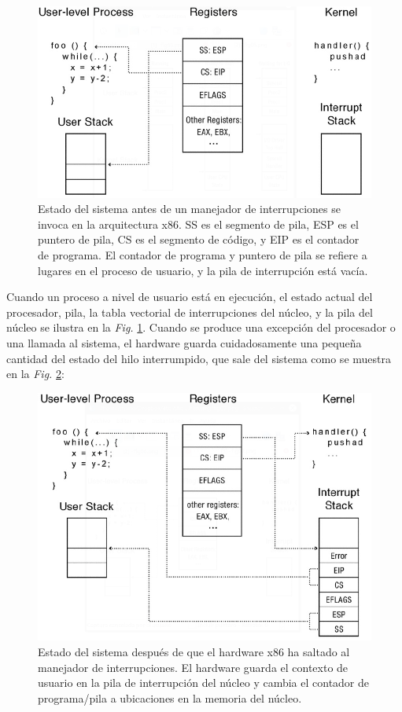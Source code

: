 \documentclass[10pt]{book}
\begin{document}
\begin{figure}[tbhp]
\centerline{\includegraphics[scale=0.55]{img/fig0206}}
\caption{Estado del sistema antes de un manejador de interrupciones se invoca en la arquitectura {\mf x86}. {\mf SS} es el segmento de pila, {\mf ESP} es el puntero de pila, {\mf CS} es el segmento de código, y {\mf EIP} es el contador de programa. El contador de programa y puntero de pila se refiere a lugares en el proceso de usuario, y la pila de interrupción está vacía.}
\label{fig0206}
\end{figure}

Cuando un proceso a nivel de usuario está en ejecución, el estado actual del procesador, pila, la tabla vectorial de interrupciones del núcleo, y la pila del núcleo se ilustra en la \textit{Fig.} \ref{fig0206}. Cuando se produce una excepción del procesador o una llamada al sistema, el hardware guarda cuidadosamente una pequeña cantidad del estado del hilo interrumpido, que sale del sistema como se muestra en la \textit{Fig.} \ref{fig0207}:

\begin{figure}[tbhp]
\centerline{\includegraphics[scale=0.55]{img/fig0207}}
\caption{Estado del sistema después de que el hardware {\mf x86} ha saltado al manejador de interrupciones. El hardware guarda el contexto de usuario en la pila de interrupción del núcleo y cambia el contador de programa/pila a ubicaciones en la memoria del núcleo.}
\label{fig0207}
\end{figure}
\end{document}
